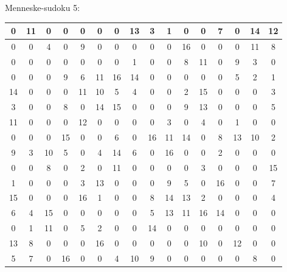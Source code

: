 \documentclass[]{report}
\begin{document}
Menneske-sudoku 5:
\begin{tabular}{|c|c|c|c||c|c|c|c||c|c|c|c||c|c|c|c|}
\hline
0&11&0&0&0&0&0&13&3&1&0&0&7&0&14&12\\\hline
0&0&4&0&9&0&0&0&0&0&16&0&0&0&11&8\\\hline
0&0&0&0&0&0&0&1&0&0&8&11&0&9&3&0\\\hline
0&0&0&9&6&11&16&14&0&0&0&0&0&5&2&1\\\hline\hline
14&0&0&0&11&10&5&4&0&0&2&15&0&0&0&3\\\hline
3&0&0&8&0&14&15&0&0&0&9&13&0&0&0&5\\\hline
11&0&0&0&12&0&0&0&0&3&0&4&0&1&0&0\\\hline
0&0&0&15&0&0&6&0&16&11&14&0&8&13&10&2\\\hline\hline
9&3&10&5&0&4&14&6&0&16&0&0&2&0&0&0\\\hline
0&0&8&0&2&0&11&0&0&0&0&3&0&0&0&15\\\hline
1&0&0&0&3&13&0&0&0&9&5&0&16&0&0&7\\\hline
15&0&0&0&16&1&0&0&8&14&13&2&0&0&0&4\\\hline\hline
6&4&15&0&0&0&0&0&5&13&11&16&14&0&0&0\\\hline
0&1&11&0&5&2&0&0&14&0&0&0&0&0&0&0\\\hline
13&8&0&0&0&16&0&0&0&0&0&10&0&12&0&0\\\hline
5&7&0&16&0&0&4&10&9&0&0&0&0&0&8&0\\\hline
\end{tabular}
\end{document}

